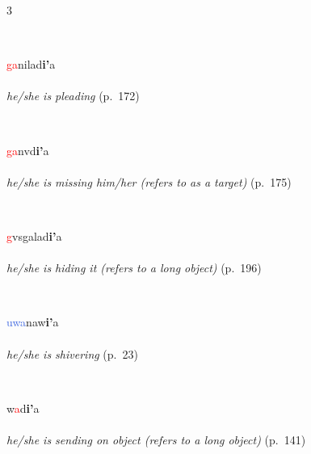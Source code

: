 \documentclass[oneside,openany]{book}%
\begin{document}
\begin{multicols}{3}
\begin{minipage}[t]{\linewidth}
\end{minipage}\\[1em]%
\begin{minipage}[t]{\linewidth}
\raggedright\noindent \textcolor{Red}{ga}nilad\textbf{i'}a\\
\\
\noindent \textit{he/she is pleading} (p.~172)
\end{minipage}\\[1em]%
\begin{minipage}[t]{\linewidth}
\raggedright\noindent \textcolor{Red}{ga}nvd\textbf{i'}a\\
\\
\noindent \textit{he/she is missing him/her (refers to as a target)} (p.~175)
\end{minipage}\\[1em]%
\begin{minipage}[t]{\linewidth}
\raggedright\noindent \textcolor{Red}{g}vsgalad\textbf{i'}a\\
\\
\noindent \textit{he/she is hiding it (refers to a long object)} (p.~196)
\end{minipage}\\[1em]%
\begin{minipage}[t]{\linewidth}
\raggedright\noindent \textcolor{RoyalBlue}{uwa}naw\textbf{i'}a\\
\\
\noindent \textit{he/she is shivering} (p.~23)
\end{minipage}\\[1em]%
\begin{minipage}[t]{\linewidth}
\raggedright\noindent w\textcolor{Red}{a}d\textbf{i'}a\\
\\
\noindent \textit{he/she is sending on object (refers to a long object)} (p.~141)
\end{minipage}\\[1em]%
\end{multicols}%
\vspace{1em}%
\needspace{1.5in}%
\end{document}
